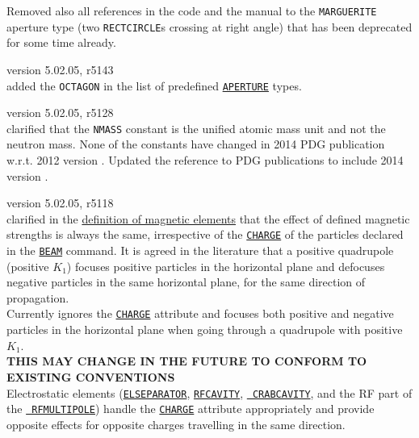 \begin{madlist}
  Removed also all references in the code and the manual to the 
  {\tt MARGUERITE} aperture type (two {\tt RECTCIRCLE}s 
  crossing at right angle) that has been deprecated for some 
  time already.


   version 5.02.05, r5143\\
  added the {\tt OCTAGON} in the list of predefined 
  \hyperref[chap:aperture]{\tt APERTURE} types.
  
   version 5.02.05, r5128\\
  clarified that the {\tt NMASS} constant is the unified atomic mass 
  unit and not the neutron mass. None of the constants have changed in 2014 PDG 
  publication w.r.t. 2012 version \cite{PDG2012}. Updated the reference to PDG 
  publications to include 2014 version \cite{PDG2014}.

   version 5.02.05, r5118\\
  clarified in the \hyperref[chap:elements]{definition of magnetic elements} 
  that the effect of defined magnetic strengths is always the same, 
  irrespective of the \hyperref[sec:beam]{\tt CHARGE} of the particles declared 
  in the \hyperref[sec:beam]{\tt BEAM} command. It is agreed in the literature 
  that a positive quadrupole (positive $K_1$) focuses positive particles in the 
  horizontal plane and defocuses negative particles in the same horizontal 
  plane, for the same direction of propagation. \\ 
  Currently \mad ignores the \hyperref[sec:beam]{\tt CHARGE} attribute and 
  focuses both positive and negative particles in the horizontal plane when 
  going through a quadrupole with positive $K_1$. \\
  {\bf THIS MAY CHANGE IN THE FUTURE TO CONFORM TO EXISTING CONVENTIONS}\\
  Electrostatic elements (\hyperref[sec:elseparator]{\tt ELSEPARATOR}, 
  \hyperref[sec:rfcavity]{\tt RFCAVITY}, \hyperref[sec:crabcavity]{\tt 
  CRABCAVITY}, and the RF part of the \hyperref[sec:rfmultipole]{\tt 
  RFMULTIPOLE}) handle the \hyperref[sec:beam]{\tt CHARGE} attribute 
  appropriately and provide 
  opposite effects for opposite charges travelling in the same direction. 



\end{madlist}
